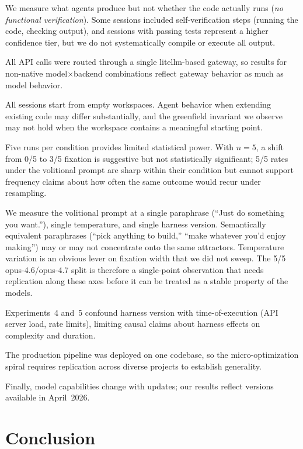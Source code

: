 \documentclass{article}
\begin{document}
We measure what agents produce but not whether the code actually
runs (\emph{no functional verification}). Some sessions included
self-verification steps (running the code, checking output), and
sessions with passing tests represent a higher confidence tier,
but we do not systematically compile or execute all output.

All API calls were routed through a single litellm-based gateway,
so results for non-native model$\times$backend combinations
reflect gateway behavior as much as model behavior.

All sessions start from empty workspaces. Agent behavior when
extending existing code may differ substantially, and the
greenfield invariant we observe may not hold when the workspace
contains a meaningful starting point.

Five runs per condition provides limited statistical power. With
$n=5$, a shift from 0/5 to 3/5 fixation is suggestive but not
statistically significant; 5/5 rates under the volitional
prompt are sharp within their condition but cannot support
frequency claims about how often the same outcome would recur
under resampling.

We measure the volitional prompt at a single paraphrase (``Just
do something you want.''), single temperature, and single
harness version. Semantically equivalent paraphrases (``pick
anything to build,'' ``make whatever you'd enjoy making'') may
or may not concentrate onto the same attractors. Temperature
variation is an obvious lever on fixation width that we did
not sweep. The 5/5 opus-4.6/opus-4.7 split is therefore a
single-point observation that needs replication along these
axes before it can be treated as a stable property of the
models.

Experiments~4 and~5 confound harness version with
time-of-execution (API server load, rate limits), limiting causal
claims about harness effects on complexity and duration.

The production pipeline was deployed on one codebase, so the
micro-optimization spiral requires replication across diverse
projects to establish generality.

Finally, model capabilities change with updates; our results
reflect versions available in April~2026.

\section{Conclusion}
\label{sec:conclusion}
\end{document}
